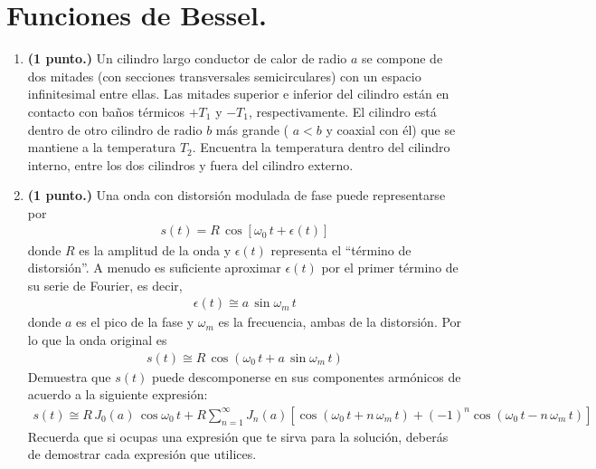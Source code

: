 \section{Funciones de Bessel.}

\begin{enumerate}
\item \textbf{(1 punto.) } Un cilindro largo conductor de calor de radio $a$ se compone de dos mitades (con secciones transversales semicirculares) con un espacio infinitesimal entre ellas. Las mitades superior e inferior del cilindro están en contacto con baños térmicos $+T_{1}$ y $-T_{1}$, respectivamente. El cilindro está dentro de otro cilindro de radio $b$ más grande ( $a < b$ y coaxial con él) que se mantiene a la temperatura $T_{2}$. Encuentra la temperatura dentro del cilindro interno, entre los dos cilindros y fuera del cilindro externo.
\item \textbf{(1 punto.) } Una onda con distorsión modulada de fase puede representarse por
\begin{align*}
s(t) = R \, \cos [ \omega_{0} \, t +  \epsilon (t)]
\end{align*}
donde $R$ es la amplitud de la onda y $\epsilon(t)$ representa el \enquote{término de distorsión}. A menudo es suficiente aproximar $\epsilon (t)$ por el primer término de su serie de Fourier, es decir,
\begin{align*}
\epsilon (t) \cong a \, \sin \omega_{m} \, t
\end{align*}
donde $a$ es el pico de la fase y $\omega_{m}$ es la frecuencia, ambas de la distorsión. Por lo que la onda original es
\begin{align*}
s(t) \cong R \, \cos (\omega_{0} \, t + a \, \sin \omega_{m} \, t)
\end{align*}
Demuestra que $s(t)$ puede descomponerse en sus componentes armónicos de acuerdo a la siguiente expresión:
\begin{align*}
s(t) \cong R \, J_{0}(a) \, \cos \omega_{0} \, t + R \sum_{n=1}^{\infty} J_{n} (a) [\cos (\omega_{0} \, t + n \, \omega_{m} \, t) + (-1)^{n} \cos (\omega_{0} \, t - n \, \omega_{m} \, t) ]
\end{align*}
Recuerda que si ocupas una expresión que te sirva para la solución, deberás de demostrar cada expresión que utilices.
\end{enumerate}

